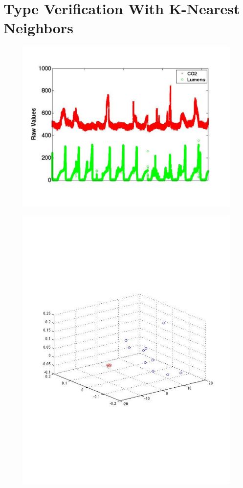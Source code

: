 



\section{Type Verification With K-Nearest Neighbors}


\begin{figure}[t!] %
\centering
\includegraphics[width=0.75\columnwidth]{figs/KETI413_co2_light_raw}
\caption{}
\label{fig:co2_light_raw}
\end{figure}

\begin{figure}[t!] %
\centering
\includegraphics[width=0.75\columnwidth]{figs/EMD_LF_PCA_413_co2_light}
\caption{}
\label{fig:EMD_LF_PCA}
\end{figure}


